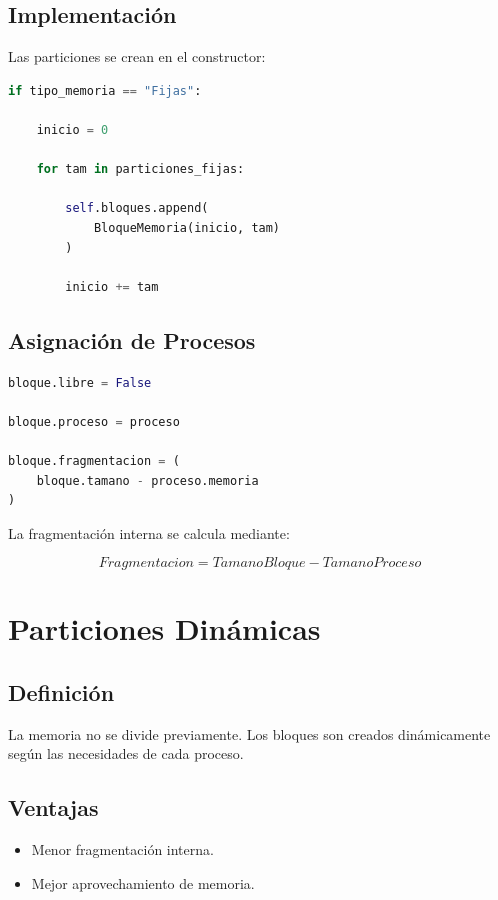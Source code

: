\subsection{Implementación}

Las particiones se crean en el constructor:

\begin{lstlisting}[language=Python]
if tipo_memoria == "Fijas":

    inicio = 0

    for tam in particiones_fijas:

        self.bloques.append(
            BloqueMemoria(inicio, tam)
        )

        inicio += tam
\end{lstlisting}

\subsection{Asignación de Procesos}

\begin{lstlisting}[language=Python]
bloque.libre = False

bloque.proceso = proceso

bloque.fragmentacion = (
    bloque.tamano - proceso.memoria
)
\end{lstlisting}

La fragmentación interna se calcula mediante:

\[
Fragmentacion = TamanoBloque - TamanoProceso
\]


\section{Particiones Dinámicas}

\subsection{Definición}

La memoria no se divide previamente. Los bloques son creados dinámicamente según las necesidades de cada proceso.

\subsection{Ventajas}

\begin{itemize}
    \item Menor fragmentación interna.
    \item Mejor aprovechamiento de memoria.
\end{itemize}


